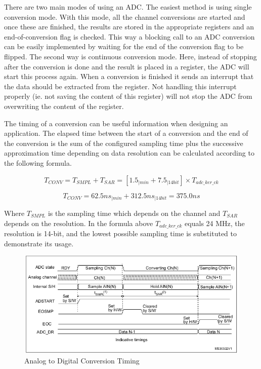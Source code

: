 There are two main modes of using an ADC. The easiest method is using single conversion mode. With this mode, all the channel conversions are started and once these are finished, the results are stored in the appropriate registers and an end-of-conversion flag is checked. This way a blocking call to an ADC conversion can be easily implemented by waiting for the end of the conversion flag to be flipped. The second way is continuous conversion mode. Here, instead of stopping after the conversion is done and the result is placed in a register, the ADC will start this process again. When a conversion is finished it sends an interrupt that the data should be extracted from the register. Not handling this interrupt properly (ie. not saving the content of this register) will not stop the ADC from overwriting the content of the register.

The timing of a conversion can be useful information when designing an application. The elapsed time between the start of a conversion and the end of the conversion is the sum of the configured sampling time plus the successive approximation time depending on data resolution can be calculated according to the following formula.

\[T_{CONV} = T_{SMPL} + T_{SAR} = [1.5_{|min} + 7.5_{|14bit}] \times T_{adc\_ker\_ck}\]

\[ T_{CONV} = 62.5 ns_{|min} + 312.5 ns_{|14bit} = 375.0 ns\]

Where $T_{SMPL}$ is the sampling time which depends on the channel and $T_{SAR}$ depends on the resolution. In the formula above $T_{adc\_ker\_ck}$ equals 24 MHz, the resolution is 14-bit, and the lowest possible sampling time is substituted to demonstrate its usage.

\begin{figure}[H]
    \centering
    \includegraphics[width=150mm, keepaspectratio]{figures/adc-timing.png}
    \caption{Analog to Digital Conversion Timing\cite{ADConversionTime}}
    \label{fig:adc-timing}
\end{figure}

